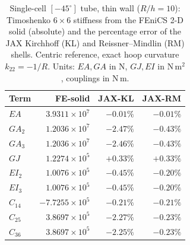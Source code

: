 \begin{table}[t]
\centering
\caption{Single-cell $[-45^\circ]$ tube, thin wall ($R/h = 10$): Timoshenko $6\times6$ stiffness from the FEniCS 2-D solid (absolute) and the percentage error of the JAX Kirchhoff (KL) and Reissner--Mindlin (RM) shells. Centric reference, exact hoop curvature $k_{22}=-1/R$. Units: $EA,GA$ in N, $GJ,EI$ in N\,m$^2$, couplings in N\,m.}
\label{tab:aniso_tube_thin}
\renewcommand{\arraystretch}{1.4}\setlength{\tabcolsep}{10pt}
\begin{tabular}{lrrr}
\toprule
Term & FE-solid & JAX-KL & JAX-RM \\
\midrule
$EA$ & $3.9311{\times}10^{7}$ & $-0.01\%$ & $-0.01\%$ \\
$GA_2$ & $1.2036{\times}10^{7}$ & $-2.47\%$ & $-0.43\%$ \\
$GA_3$ & $1.2036{\times}10^{7}$ & $-2.46\%$ & $-0.43\%$ \\
$GJ$ & $1.2274{\times}10^{5}$ & $+0.33\%$ & $+0.33\%$ \\
$EI_2$ & $1.0076{\times}10^{5}$ & $-0.45\%$ & $-0.20\%$ \\
$EI_3$ & $1.0076{\times}10^{5}$ & $-0.45\%$ & $-0.20\%$ \\
$C_{14}$ & $-7.7255{\times}10^{5}$ & $-0.21\%$ & $-0.21\%$ \\
$C_{25}$ & $3.8697{\times}10^{5}$ & $-2.27\%$ & $-0.23\%$ \\
$C_{36}$ & $3.8697{\times}10^{5}$ & $-2.25\%$ & $-0.23\%$ \\
\bottomrule
\end{tabular}
\end{table}
